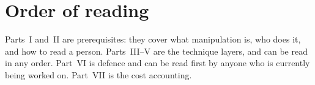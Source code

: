\section*{Order of reading}

Parts~I and~II are prerequisites: they cover what manipulation is, who does
it, and how to read a person. Parts~III--V are the technique layers, and can
be read in any order. Part~VI is defence and can be read first by anyone who
is currently being worked on. Part~VII is the cost accounting.
